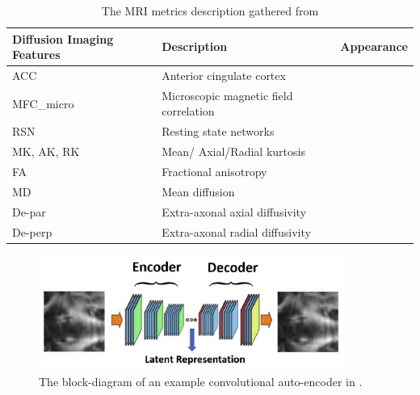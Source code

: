 \documentclass[runningheads]{llncs}
\begin{document}
\begin{table}[]
\centering
\caption{The MRI metrics description gathered from \cite{lui_classification_2014,vergara_dynamic_2018,minaee_mtbi_2019,mitra_statistical_2016,vergara_detection_2016}}
\begin{tabular}{l@{\hskip 0.3in}l{\hskip 0.3in}l}
\hline
Diffusion Imaging Features & Description & Appearance  \\\hline
ACC & Anterior cingulate cortex & \cite{lui_classification_2014} \\%
MFC_{micro} & Microscopic magnetic field correlation & \cite{lui_classification_2014}\\%
RSN & Resting state networks & \cite{lui_classification_2014,vergara_detection_2016}\\%
MK, AK, RK & Mean/ Axial/Radial kurtosis & \cite{lui_classification_2014,minaee_mtbi_2019} \\%
FA & Fractional anisotropy & \cite{wozniak_neurocognitive_2007,mitra_statistical_2016,minaee_mtbi_2019,vergara_detection_2016} \\%
MD & Mean diffusion & \cite{minaee_mtbi_2019}\\%
De-par & Extra-axonal axial diffusivity & \cite{minaee_mtbi_2019}\\
De-perp & Extra-axonal radial diffusivity &\cite{minaee_mtbi_2019}\\

\hline
\end{tabular}
\label{tab:mrimetrics}
\end{table}

\begin{figure}[h]
\centering
\includegraphics[width=10cm]{imgs/autoencoder.jpg}
\caption{The block-diagram of an example convolutional auto-encoder in \cite{minaee_mtbi_2019}.}
\label{fig:autoencode}
\end{figure}
\end{document}
